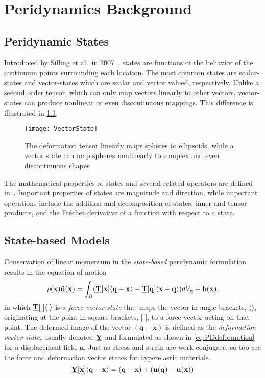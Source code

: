 \chapter{Peridynamics Background}

\section{Peridynamic States}
%
Introduced by Silling et al.\ in 2007~\cite{silling2007peridynamic}, states are functions of the behavior of the continuum points surrounding each location.
The most common states are scalar-states and vector-states which are scalar and vector valued, respectively.
Unlike a second order tensor, which can only map vectors linearly to other vectors, vector-states can produce nonlinear or even discontinuous mappings.  
This difference is illustrated in \cref{fig:VectorState}.
%
\begin{figure}[h]
  \centering
\texttt{[image: VectorState]}
\caption[Deformation tensor vs. deformation vector state]{The deformation tensor linearly maps spheres to ellipsoids, while a vector state can map spheres nonlinearly to complex and even discontinuous shapes \cite{silling2007peridynamic}}
\label{fig:VectorState}
\end{figure}
%

The mathematical properties of states and several related operators are defined in~\cite{silling2007peridynamic}.
Important properties of states are magnitude and direction, while important operations include the addition and decomposition of states, inner and tensor products, and the Fr\'{e}chet derivative of a function with respect to a state.

\section{State-based Models}
Conservation of linear momentum in the \textit{state-based} peridynamic formulation results in the equation of motion
%
\begin{equation}
\label{eq:PDstateEoM}
\rho(\mathbf{x})\ddot{\mathbf{u}}(\mathbf{x}) = \int_\Omega (\vstate{T}{\mathbf{x}}{\mathbf{q}-\mathbf{x}}-\vstate{T}{\mathbf{q}}{\mathbf{x}-\mathbf{q}}) dV_\mathbf{q}  + \mathbf{b}(\mathbf{x}),
\end{equation}
%
in which $\vstate{T}{\;}{\;}$ is a \textit{force vector-state} that maps the vector in angle brackets, $\langle \rangle$, originating at the point in square brackets, [ ], to a force vector acting on that point.
The deformed image of the vector $(\mathbf{q-x})$ is defined as the \textit{deformation vector-state}, usually denoted $\vstate{Y}{}{}$ and formulated as shown in \cref{eq:PDdeformation} for a displacement field \(\mathbf{u}\). 
Just as stress and strain are work conjugate, so too are the force and deformation vector states for hyperelastic materials.
%
\begin{equation}
\label{eq:PDdeformation}
\vstate{Y}{\mathbf{x}}{\mathbf{q}-\mathbf{x}} = (\mathbf{q}-\mathbf{x}) + (\mathbf{u}(\mathbf{q})-\mathbf{u}(\mathbf{x}))
\end{equation}
%

